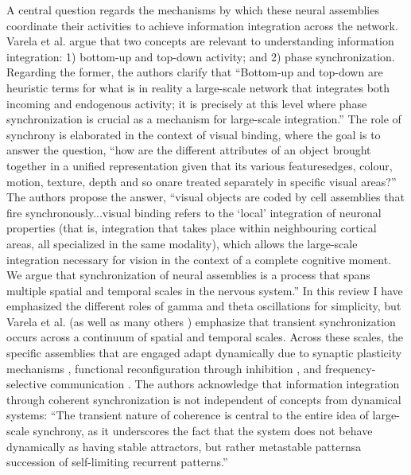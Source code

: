 A central question regards the mechanisms by which these neural assemblies coordinate their activities to achieve information integration across the network. Varela et al. argue that two concepts are relevant to understanding information integration: 1) bottom-up and top-down activity; and 2) phase synchronization. Regarding the former, the authors clarify that ``Bottom-up and top-down are heuristic terms for what is in reality a large-scale network that integrates both incoming and endogenous activity; it is precisely at this level where phase synchronization is crucial as a mechanism for large-scale integration.'' The role of synchrony is elaborated in the context of visual binding, where the goal is to answer the question, ``how are the different attributes of an object brought together in a unified representation given that its various features\textemdash edges, colour, motion, texture, depth and so on\textemdash are treated separately in specific visual areas?'' The authors propose the answer, ``visual objects are coded by cell assemblies that fire synchronously...visual binding refers to the `local' integration of neuronal properties (that is, integration that takes place within neighbouring cortical areas, all specialized in the same modality), which allows the large-scale integration necessary for vision in the context of a complete cognitive moment. We argue that synchronization of neural assemblies is a process that spans multiple spatial and temporal scales in the nervous system.'' In this review I have emphasized the different roles of gamma and theta oscillations for simplicity, but Varela et al. (as well as many others \cite{stsa2000,budr2004,bu2006,sape1998,jeco2007,uhro2009}) emphasize that transient synchronization occurs across a continuum of spatial and temporal scales. Across these scales, the specific assemblies that are engaged adapt dynamically due to synaptic plasticity mechanisms \cite{abre2004,ab2008,xxx}, functional reconfiguration through inhibition \cite{robu2015}, and frequency-selective communication \cite{izde2003}. The authors acknowledge that information integration through coherent synchronization is not independent of concepts from dynamical systems: ``The transient nature of coherence is central to the entire idea of large-scale synchrony, as it underscores the fact that the system does not behave dynamically as having stable attractors, but rather metastable patterns\textemdash a succession of self-limiting recurrent patterns.''

